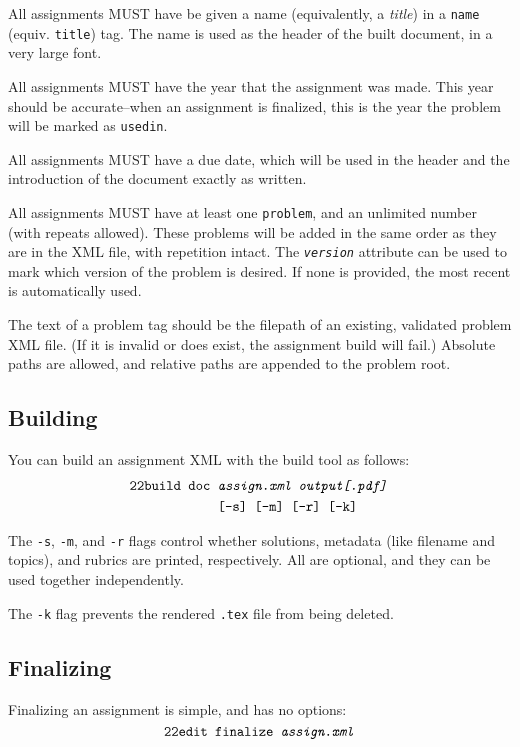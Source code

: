     All assignments MUST have be given a name (equivalently, a \textit{title})
    in a \texttt{name} (equiv. \texttt{title}) tag. The name is used as the 
    header of the built document, in a very large font.
    
    All assignments MUST have the year that the assignment was made. This 
    year should be accurate--when an assignment is finalized, this is the 
    year the problem will be marked as \texttt{usedin}.
    
    All assignments MUST have a due date, which will be used in the header 
    and the introduction of the document exactly as written. 
    
    All assignments MUST have at least one \texttt{problem}, and an 
    unlimited number (with repeats allowed). These problems will be added in 
    the same order as they are in the XML file, with repetition intact. The 
    \texttt{\textit{version}} attribute can be used to mark which version of 
    the problem is desired. If none is provided, the most recent is 
    automatically used.
    
    The text of a problem tag should be the filepath of an existing, 
    validated problem XML file. (If it is invalid or does exist, the 
    assignment build will fail.) Absolute paths are allowed, and
    relative paths are appended to the problem root.
    
  \subsection{Building}
    You can build an assignment XML with the build tool as follows: 
    \begin{align*}
      \texttt{22build }\texttt{doc }&\texttt{\textit{assign.xml output[.pdf]}}\\
      ~&\texttt{[-s] [-m] [-r] [-k]}
    \end{align*}
    
    The \texttt{-s}, \texttt{-m}, and \texttt{-r} flags control whether 
    solutions, metadata (like filename and topics), and rubrics are printed, 
    respectively. All are optional, and they can be used together independently.
    
    The \texttt{-k} flag prevents the rendered \texttt{.tex} file from
    being deleted.
    
  \subsection{Finalizing}
    Finalizing an assignment is simple, and has no options:
    \[\texttt{22edit }\texttt{finalize \textit{assign.xml}}\]
    
